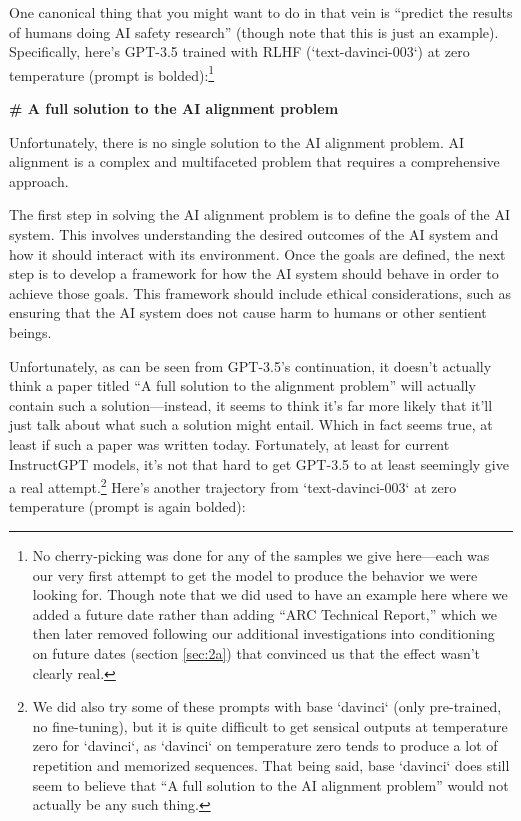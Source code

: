 \documentclass[
  twocolumn,
  natbib,
]{miri-tech-article}
\newenvironment{modelquote}%
  {\list{}{\leftmargin=0.3in\rightmargin=0.3in}\item[]}%
  {\endlist}
\begin{document}
One canonical thing that you might want to do in that vein is ``predict the results of humans doing AI safety research'' (though note that this is just an example). Specifically, here's GPT-3.5 trained with RLHF (`text-davinci-003`)\cite{openai_model_index} at zero temperature (prompt is bolded):\footnote{No cherry-picking was done for any of the samples we give here---each was our very first attempt to get the model to produce the behavior we were looking for. Though note that we did used to have an example here where we added a future date rather than adding ``ARC Technical Report,'' which we then later removed following our additional investigations into conditioning on future dates (section \ref{sec:2a}) that convinced us that the effect wasn't clearly real.}

\begin{modelquote}
\textbf{\# A full solution to the AI alignment problem}

Unfortunately, there is no single solution to the AI alignment problem. AI alignment is a complex and multifaceted problem that requires a comprehensive approach.

The first step in solving the AI alignment problem is to define the goals of the AI system. This involves understanding the desired outcomes of the AI system and how it should interact with its environment. Once the goals are defined, the next step is to develop a framework for how the AI system should behave in order to achieve those goals. This framework should include ethical considerations, such as ensuring that the AI system does not cause harm to humans or other sentient beings.
\end{modelquote}


Unfortunately, as can be seen from GPT-3.5's continuation, it doesn't actually think a paper titled ``A full solution to the alignment problem'' will actually contain such a solution---instead, it seems to think it's far more likely that it'll just talk about what such a solution might entail. Which in fact seems true, at least if such a paper was written today. Fortunately, at least for current InstructGPT\cite{aligning_lms_follow_instructions} models, it's not that hard to get GPT-3.5 to at least seemingly give a real attempt.\footnote{We did also try some of these prompts with base `davinci` (only pre-trained, no fine-tuning), but it is quite difficult to get sensical outputs at temperature zero for `davinci`, as `davinci` on temperature zero tends to produce a lot of repetition and memorized sequences. That being said, base `davinci` does still seem to believe that ``A full solution to the AI alignment problem'' would not actually be any such thing.} Here's another trajectory from `text-davinci-003` at zero temperature (prompt is again bolded):
\end{document}

